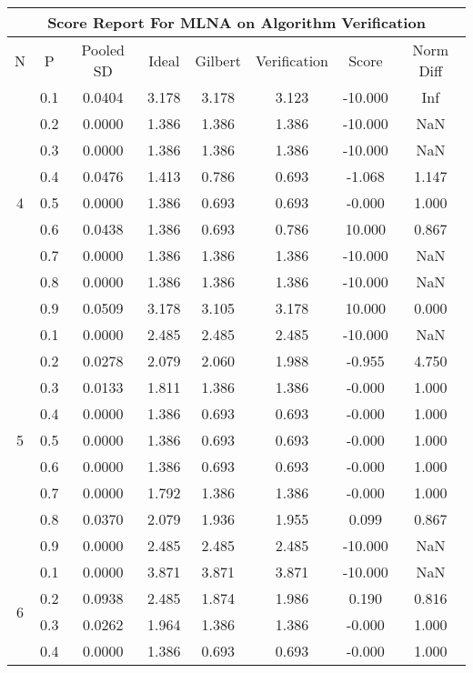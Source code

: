 \documentclass[11pt,a4paper]{report}
\begin{document}
\begin{longtable}{ | c | c || c | c | c | c | c | c | }
\hline
\multicolumn{8}{|c|}{ Score Report For MLNA on Algorithm Verification} \\
\hline
N & P & Pooled SD &  Ideal &  Gilbert & Verification  & Score & Norm Diff \\
 \hline
 \hline
 \endhead
\multirow{9}{*}{4} & 0.1 & 0.0404 & 3.178 & 3.178 & 3.123 & -10.000 & Inf \\
 & 0.2 & 0.0000 & 1.386 & 1.386 & 1.386 & -10.000 & NaN \\
 & 0.3 & 0.0000 & 1.386 & 1.386 & 1.386 & -10.000 & NaN \\
 & 0.4 & 0.0476 & 1.413 & 0.786 & 0.693 & -1.068 & 1.147 \\
 & 0.5 & 0.0000 & 1.386 & 0.693 & 0.693 & -0.000 & 1.000 \\
 & 0.6 & 0.0438 & 1.386 & 0.693 & 0.786 & 10.000 & 0.867 \\
 & 0.7 & 0.0000 & 1.386 & 1.386 & 1.386 & -10.000 & NaN \\
 & 0.8 & 0.0000 & 1.386 & 1.386 & 1.386 & -10.000 & NaN \\
 & 0.9 & 0.0509 & 3.178 & 3.105 & 3.178 & 10.000 & 0.000 \\
 \hline
\multirow{9}{*}{5} & 0.1 & 0.0000 & 2.485 & 2.485 & 2.485 & -10.000 & NaN \\
 & 0.2 & 0.0278 & 2.079 & 2.060 & 1.988 & -0.955 & 4.750 \\
 & 0.3 & 0.0133 & 1.811 & 1.386 & 1.386 & -0.000 & 1.000 \\
 & 0.4 & 0.0000 & 1.386 & 0.693 & 0.693 & -0.000 & 1.000 \\
 & 0.5 & 0.0000 & 1.386 & 0.693 & 0.693 & -0.000 & 1.000 \\
 & 0.6 & 0.0000 & 1.386 & 0.693 & 0.693 & -0.000 & 1.000 \\
 & 0.7 & 0.0000 & 1.792 & 1.386 & 1.386 & -0.000 & 1.000 \\
 & 0.8 & 0.0370 & 2.079 & 1.936 & 1.955 & 0.099 & 0.867 \\
 & 0.9 & 0.0000 & 2.485 & 2.485 & 2.485 & -10.000 & NaN \\
 \hline
\multirow{9}{*}{6} & 0.1 & 0.0000 & 3.871 & 3.871 & 3.871 & -10.000 & NaN \\
 & 0.2 & 0.0938 & 2.485 & 1.874 & 1.986 & 0.190 & 0.816 \\
 & 0.3 & 0.0262 & 1.964 & 1.386 & 1.386 & -0.000 & 1.000 \\
 & 0.4 & 0.0000 & 1.386 & 0.693 & 0.693 & -0.000 & 1.000 \\

\end{longtable}
\end{document}
